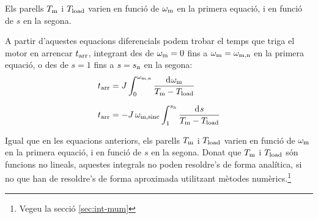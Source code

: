 Els parells $T_\mathrm{m}$ i $T_\mathrm{load}$ varien en funció de $\omega_\mathrm{m}$ en la primera equació, i en funció de $s$ en la segona.

A partir d'aquestes equacions diferencials podem trobar el temps que triga el motor en arrencar $t_\mathrm{arr}$, integrant des de $\omega_\mathrm{m}=0$ fins a $\omega_\mathrm{m}=\omega_\mathrm{m,n}$ en la primera equació, o des de $s = 1$ fins a $s = s_\mathrm{n}$ en la segona:
\begin{subequations}
\begin{align}
    t\ped{arr} &= J\int_{0}^{\omega\ped{m,n}} \frac{\diff\omega\ped{m}}{T\ped{m}-T\ped{load}}\label{eq:tarr-mot}\\[1.5ex]
    t\ped{arr} &= - J\,\omega\ped{m,sinc} \int_{1}^{s\ped{n}} \frac{\diff s}{T\ped{m}-T\ped{load}}
\end{align}
\end{subequations}

Igual que en les equacions anteriors, els parells $T_\mathrm{m}$ i $T_\mathrm{load}$ varien en funció de $\omega_\mathrm{m}$ en la primera equació, i en funció de $s$ en la segona. Donat que $T_\mathrm{m}$ i $T_\mathrm{load}$ són funcions no lineals, aquestes integrals no poden resoldre's de forma analítica, si no que han de resoldre's de forma aproximada utilitzant mètodes numèrics.\footnote{Vegeu la secció \ref{sec:int-mum}}


